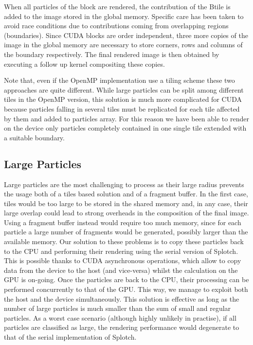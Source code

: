 \documentclass[1p]{elsarticle}
\begin{document}
When all particles of the block are rendered, the contribution of the Btile is added to the image stored in the global memory. Specific care has been taken to avoid race conditions due to contributions coming
from overlapping regions (boundaries). Since CUDA blocks are order independent, three more copies of the image in the global memory are necessary to store corners, rows and columns of the boundary respectively. The final rendered image is then obtained by executing a follow up kernel compositing these copies.

Note that, even if the OpenMP implementation use a tiling scheme these two approaches are quite different. While large particles can be split among different tiles in the OpenMP version, this solution is much more complicated for CUDA because particles falling in several tiles must be replicated for each tile affected by them and added to particles array. For this reason we have been able to render on the device only particles completely contained in one single tile extended with a suitable boundary. 

\subsection{Large Particles}
\label{sec:largeparticles}
Large particles are the most challenging to process as their large
radius prevents the usage both of a tiles based solution and of a fragment buffer.
In the first case, tiles would be too large to be stored in the shared memory
and, in any case, their large overlap could lead to strong overheads in the composition of the
final image. Using a fragment buffer instead would require too much memory, since
for each particle a large number of fragments would be generated, possibly
larger than the available memory. Our solution to these problems is to copy these particles back to the CPU and performing their rendering
using the serial version of Splotch. This is possible thanks to CUDA asynchronous
operations, which allow to copy data from the device to the host (and vice-versa)
whilst the calculation on the GPU is on-going. Once the particles are back to the CPU,
their processing can be performed concurrently to that of the GPU.  
This way, we manage to exploit both the host and the device simultaneously.
This solution is effective as long as the number of large particles
is much smaller than the sum of small and regular particles. As a worst case scenario (although highly unlikely in practise), if all particles are classified as large, the rendering performance would degenerate to that of the serial implementation of Splotch.
\end{document}
